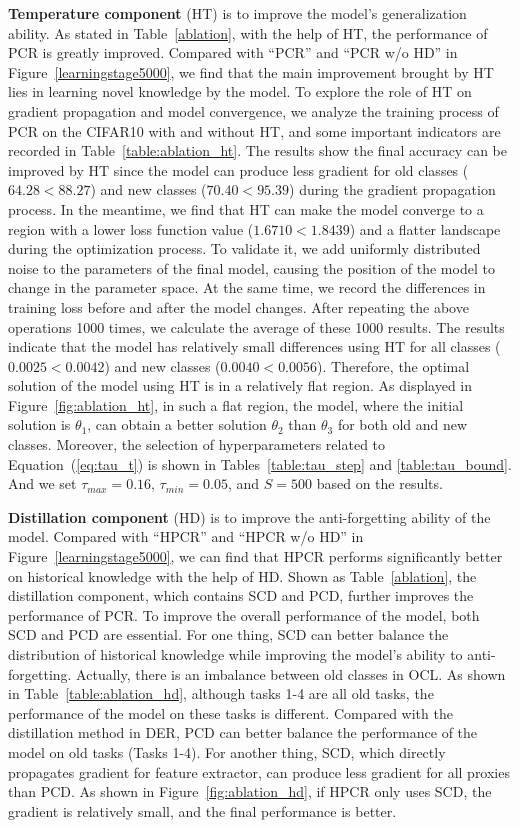 \textbf{Temperature component} (HT) is to improve the model's generalization ability. As stated in Table~\ref{ablation}, with the help of HT, the performance of PCR is greatly improved. Compared with ``PCR'' and ``PCR w/o HD'' in Figure~\ref{learningstage5000}, we find that the main improvement brought by HT lies in learning novel knowledge by the model. To explore the role of HT on gradient propagation and model convergence, we analyze the training process of PCR on the CIFAR10 with and without HT, and some important indicators are recorded in Table~\ref{table:ablation_ht}. The results show the final accuracy can be improved by HT since the model can produce less gradient for old classes ($64.28<88.27$) and new classes ($70.40<95.39$) during the gradient propagation process. In the meantime, we find that HT can make the model converge to a region with a lower loss function value ($1.6710<1.8439$) and a flatter landscape during the optimization process. To validate it, we add uniformly distributed noise to the parameters of the final model, causing the position of the model to change in the parameter space. At the same time, we record the differences in training loss before and after the model changes. After repeating the above operations 1000 times, we calculate the average of these 1000 results. The results indicate that the model has relatively small differences using HT for all classes ($0.0025<0.0042$) and new classes ($0.0040<0.0056$). Therefore, the optimal solution of the model using HT is in a relatively flat region. As displayed in Figure~\ref{fig:ablation_ht}, in such a flat region, the model, where the initial solution is $\theta_1$, can obtain a better solution $\theta_2$ than $\theta_3$ for both old and new classes. Moreover, the selection of hyperparameters related to Equation~(\ref{eq:tau_t}) is shown in Tables~\ref{table:tau_step} and \ref{table:tau_bound}. And we set $\tau_{max}=0.16$, $\tau_{min}=0.05$, and $S=500$ based on the results. 






\textbf{Distillation component} (HD) is to improve the anti-forgetting ability of the model. Compared with ``HPCR'' and ``HPCR w/o HD'' in Figure~\ref{learningstage5000}, we can find that HPCR performs significantly better on historical knowledge with the help of HD. Shown as Table~\ref{ablation}, the distillation component, which contains SCD and PCD, further improves the performance of PCR. To improve the overall performance of the model, both SCD and PCD are essential. For one thing, SCD can better balance the distribution of historical knowledge while improving the model's ability to anti-forgetting. Actually, there is an imbalance between old classes in OCL. As shown in Table~\ref{table:ablation_hd}, although tasks 1-4 are all old tasks, the performance of the model on these tasks is different. Compared with the distillation method in DER, PCD can better balance the performance of the model on old tasks (Tasks 1-4). For another thing, SCD, which directly propagates gradient for feature extractor, can produce less gradient for all proxies than PCD. As shown in Figure~\ref{fig:ablation_hd}, if HPCR only uses SCD, the gradient is relatively small, and the final performance is better.

